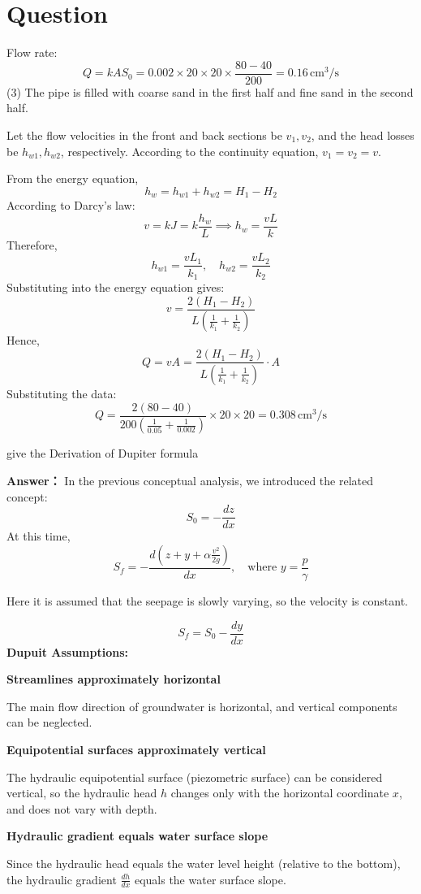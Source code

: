 \documentclass[12pt,a4paper]{article}
\newcounter{question}
\newenvironment{questions}{
    \setcounter{question}{0}
    \section*{Question}
    \begin{enumerate}[leftmargin=1.5em,label={\arabic*．}]
}{
    \end{enumerate}
}
\newcommand{\answer}[1]{\par\noindent\textbf{Answer：} #1\par\vspace{1em}}
\begin{document}
\begin{questions}
{Flow rate:
\[
Q = k A S_0 = 0.002 \times 20 \times 20 \times \frac{80 - 40}{200} = 0.16 \, \mathrm{cm}^3/\mathrm{s}
\]
(3) The pipe is filled with coarse sand in the first half and fine sand in the second half.

Let the flow velocities in the front and back sections be \( v_1, v_2 \), and the head losses be \( h_{w1}, h_{w2} \), respectively. According to the continuity equation, \( v_1 = v_2 = v \).

From the energy equation, 
\[
h_w = h_{w1} + h_{w2} = H_1 - H_2
\]
According to Darcy's law:
\[
v = k J = k \frac{h_w}{L} \implies h_w = \frac{v L}{k}
\]
Therefore,
\[
h_{w1} = \frac{v L_1}{k_1}, \quad h_{w2} = \frac{v L_2}{k_2}
\]
Substituting into the energy equation gives:
\[
v = \frac{2(H_1 - H_2)}{L \left(\frac{1}{k_1} + \frac{1}{k_2}\right)}
\]
Hence,
\[
Q = v A = \frac{2(H_1 - H_2)}{L \left(\frac{1}{k_1} + \frac{1}{k_2}\right)} \cdot A
\]
Substituting the data:
\[
Q = \frac{2(80 - 40)}{200 \left(\frac{1}{0.05} + \frac{1}{0.002}\right)} \times 20 \times 20 = 0.308 \, \mathrm{cm}^3/\mathrm{s}
\]

\item give the Derivation of Dupiter formula

\answer{
In the previous conceptual analysis, we introduced the related concept:
\[
S_0 = -\frac{dz}{dx}
\]
At this time,
\[
S_f = - \frac{d \left(z + y + \alpha \frac{v^2}{2g}\right)}{dx}, \quad \text{where } y = \frac{p}{\gamma}
\]
\begin{tcolorbox}[colframe=purple!75!black, colback=purple!10!white, title=Important]
Here it is assumed that the seepage is slowly varying, so the velocity is constant.
\end{tcolorbox}
\[
S_f = S_0 - \frac{dy}{dx}
\]
\textbf{Dupuit Assumptions:}

\textbf{Streamlines approximately horizontal}

The main flow direction of groundwater is horizontal, and vertical components can be neglected.

\textbf{Equipotential surfaces approximately vertical}

The hydraulic equipotential surface (piezometric surface) can be considered vertical, so the hydraulic head \( h \) changes only with the horizontal coordinate \( x \), and does not vary with depth.

\textbf{Hydraulic gradient equals water surface slope}

Since the hydraulic head equals the water level height (relative to the bottom), the hydraulic gradient \( \frac{dh}{dx} \) equals the water surface slope.

}}
\end{questions}
\end{document}
